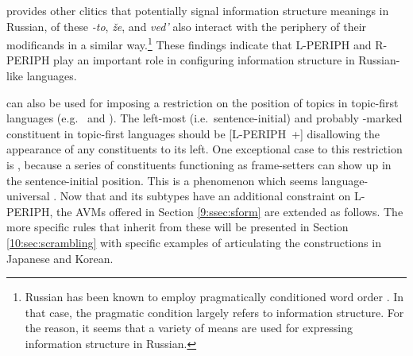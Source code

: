 \noindent \citet{gracheva:13} provides other clitics that potentially
signal information structure meanings in Russian, of these
\textit{-to}, \textit{\v{z}e}, and \textit{ved'} also interact with
the periphery of their modificands in a similar way.\footnote{Russian
  has been known to employ pragmatically conditioned word order
  \citep{rodionova:01}. In that case, the pragmatic condition largely
  refers to information structure. For the reason, it seems that a
  variety of means are used for expressing information structure in
  Russian.}  These findings indicate that L-PERIPH and R-PERIPH play
an important role in configuring information structure in Russian-like
languages.


 can also be used for imposing a restriction on the
position of topics in topic-first languages (e.g.\  and
).  The left-most (i.e.\ sentence-initial) and probably
-marked constituent in topic-first languages should be
\mbox{[L-PERIPH +]} disallowing the appearance of any constituents to
its left.  One exceptional case to this restriction is
, because a series of constituents functioning as
frame-setters can show up in the sentence-initial position. This is a
phenomenon which seems language-universal
\citep{li:thompson:76,chafe:76,lambrecht:96}. Now that
 and its subtypes have an additional constraint on
L-PERIPH, the AVMs offered in
Section \ref{9:ssec:sform}  are extended as
follows. The more specific rules that inherit from
these will be presented in
Section \ref{10:sec:scrambling}  with specific
examples of articulating the  constructions in
Japanese and Korean.





